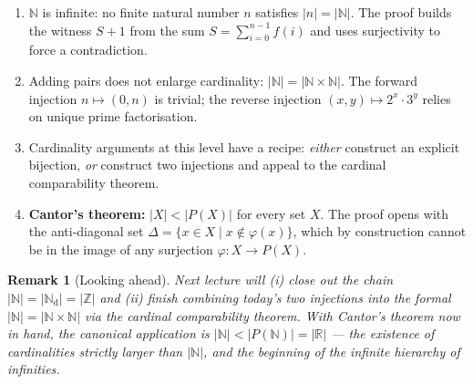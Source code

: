 \documentclass[11pt]{article}
\theoremstyle{defstyle}
\theoremstyle{thmstyle}
\theoremstyle{notstyle}
\newtheorem*{remark}{Remark}
\theoremstyle{cautionstyle}
\newcommand{\Z}{\mathbb{Z}}
\newcommand{\N}{\mathbb{N}}
\newcommand{\R}{\mathbb{R}}
\newcommand{\Nd}{\mathbb{N}_{\text{d}}}
\begin{document}
\begin{enumerate}[leftmargin=*]
  \item $\N$ is infinite: no finite natural number $n$ satisfies $|n| = |\N|$.
        The proof builds the witness $S+1$ from the sum
        $S = \sum_{i=0}^{n-1} f(i)$ and uses surjectivity to force a
        contradiction.
  \item Adding pairs does not enlarge cardinality: $|\N| = |\N \times \N|$.
        The forward injection $n \mapsto (0, n)$ is trivial; the reverse
        injection $(x, y) \mapsto 2^{x} \cdot 3^{y}$ relies on unique prime
        factorisation.
  \item Cardinality arguments at this level have a recipe: \emph{either}
        construct an explicit bijection, \emph{or} construct two injections
        and appeal to the cardinal comparability theorem.
  \item \textbf{Cantor's theorem:} $|X| < |P(X)|$ for every set $X$. The proof
        opens with the anti-diagonal set
        $\Delta = \{x \in X \mid x \notin \varphi(x)\}$, which by construction
        cannot be in the image of any surjection $\varphi : X \to P(X)$.
\end{enumerate}

\begin{notebox}
\begin{remark}[Looking ahead]
Next lecture will (i) close out the chain $|\N| = |\Nd| = |\Z|$ and (ii)
finish combining today's two injections into the formal $|\N| = |\N \times \N|$
via the cardinal comparability theorem. With Cantor's theorem now in hand, the
canonical application is $|\N| < |P(\N)| = |\R|$ --- the existence of
cardinalities strictly larger than $|\N|$, and the beginning of the
infinite hierarchy of infinities.
\end{remark}
\end{notebox}
\end{document}
